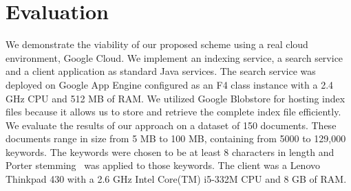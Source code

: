 \section{Evaluation}
\label{sec:eval}

We demonstrate the viability of our proposed scheme using a real cloud environment, Google Cloud.
We implement an indexing service, a search service and a
client application as standard Java services. The search service was deployed
on Google App Engine configured as an F4 class instance with a 2.4 GHz CPU and 512
MB of RAM. We utilized Google Blobstore for hosting index files because
it allows us to store and retrieve the complete index file efficiently.
We evaluate the results of our approach on a dataset of 150 documents. 
These documents range in size from 5 MB to 100 MB, containing from 5000 to
129,000 keywords. The keywords were chosen to be at least 8 characters in
length and Porter stemming~\cite{porter} was applied to those keywords.
The client was a Lenovo Thinkpad 430 with a 2.6 GHz Intel Core(TM) i5-332M
CPU and 8 GB of RAM.

%
%

